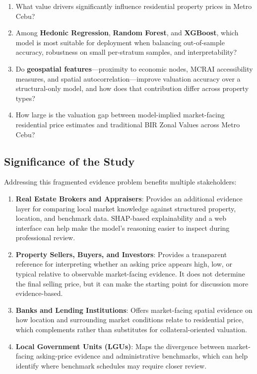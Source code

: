 \begin{enumerate}
\item What value drivers significantly influence residential property prices in Metro Cebu?
\item Among \textbf{Hedonic Regression}, \textbf{Random Forest}, and \textbf{XGBoost}, which model is most suitable for deployment when balancing out-of-sample accuracy, robustness on small per-stratum samples, and interpretability?
\item Do \textbf{geospatial features}---proximity to economic nodes, MCRAI accessibility measures, and spatial autocorrelation---improve valuation accuracy over a structural-only model, and how does that contribution differ across property types?
\item How large is the valuation gap between model-implied market-facing residential price estimates and traditional BIR Zonal Values across Metro Cebu?
\end{enumerate}


\subsection{Significance of the Study}\label{significance-of-the-study}

Addressing this fragmented evidence problem benefits multiple stakeholders:

\begin{enumerate}
\item \textbf{Real Estate Brokers and Appraisers}: Provides an additional evidence layer for comparing local market knowledge against structured property, location, and benchmark data. SHAP-based explainability and a web interface can help make the model's reasoning easier to inspect during professional review.
\item \textbf{Property Sellers, Buyers, and Investors}: Provides a transparent reference for interpreting whether an asking price appears high, low, or typical relative to observable market-facing evidence. It does not determine the final selling price, but it can make the starting point for discussion more evidence-based.
\item \textbf{Banks and Lending Institutions}: Offers market-facing spatial evidence on how location and surrounding market conditions relate to residential price, which complements rather than substitutes for collateral-oriented valuation.
\item \textbf{Local Government Units (LGUs)}: Maps the divergence between market-facing asking-price evidence and administrative benchmarks, which can help identify where benchmark schedules may require closer review.
\end{enumerate}


